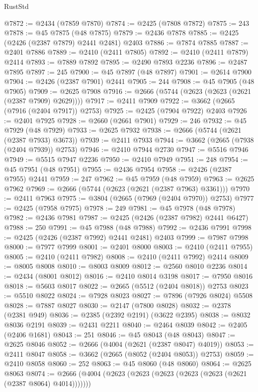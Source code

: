 \begin{lexlean}{RustStd}
\begin{coremodule}
@7872 := @2434 (@7859 @7870)
@7874 := @2425 (@7808 @7872)
@7875 := 243
@7878 := @45 @7875 (@48 @7875)
@7879 := @2436 @7878
@7885 := @2425 (@2426 (@2387 @7879) @2441 @2481) @2403
@7886 := @7874 @7885
@7887 := @2401 @7886
@7889 := @2410 (@2411 @7805)
@7892 := @2410 (@2411 @7879) @2414
@7893 := @7889 @7892
@7895 := @2490 @7893 @2236
@7896 := @2487 @7895
@7897 := 245
@7900 := @45 @7897 (@48 @7897)
@7901 := @2614 @7900
@7904 := @2426 (@2387 @7901) @2441
@7905 := 244
@7908 := @45 @7905 (@48 @7905)
@7909 := @2625 @7908
@7916 := @2666 (@5744 (@2623 (@2623 (@2621 (@2387 @7909) @2629))))
@7917 := @2411 @7909
@7922 := @3662 (@2665 (@7916 (@2404 @7917)) @2753)
@7925 := @2425 (@7904 @7922) @2403
@7926 := @2401 @7925
@7928 := @2660 (@2661 @7901)
@7929 := 246
@7932 := @45 @7929 (@48 @7929)
@7933 := @2625 @7932
@7938 := @2666 (@5744 (@2621 (@2387 @7933) @3673))
@7939 := @2411 @7933
@7944 := @3662 (@2665 (@7938 (@2404 @7939)) @2753)
@7946 := @2410 @7944 @2730
@7947 := @5516 @7946
@7949 := @5515 @7947 @2236
@7950 := @2410 @7949
@7951 := 248
@7954 := @45 @7951 (@48 @7951)
@7955 := @2436 @7954
@7958 := @2426 (@2387 @7955) @2441
@7959 := 247
@7962 := @45 @7959 (@48 @7959)
@7963 := @2625 @7962
@7969 := @2666 (@5744 (@2623 (@2621 (@2387 @7963) @3361)))
@7970 := @2411 @7963
@7975 := @3804 (@2665 (@7969 (@2404 @7970)) @2753)
@7977 := @2425 (@7958 @7975)
@7978 := 249
@7981 := @45 @7978 (@48 @7978)
@7982 := @2436 @7981
@7987 := @2425 (@2426 (@2387 @7982) @2441 @6427)
@7988 := 250
@7991 := @45 @7988 (@48 @7988)
@7992 := @2436 @7991
@7998 := @2425 (@2426 (@2387 @7992) @2441 @2481) @2403
@7999 := @7987 @7998
@8000 := @7977 @7999
@8001 := @2401 @8000
@8003 := @2410 (@2411 @7955)
@8005 := @2410 (@2411 @7982)
@8008 := @2410 (@2411 @7992) @2414
@8009 := @8005 @8008
@8010 := @8003 @8009
@8012 := @2560 @8010 @2236
@8014 := @2434 (@8001 @8012)
@8016 := @2410 @8014 @3198
@8017 := @7950 @8016
@8018 := @5603 @8017
@8022 := @2665 (@5512 (@2404 @8018)) @2753
@8023 := @5510 @8022
@8024 := @7928 @8023
@8027 := @7896 (@7926 @8024) @5508
@8028 := @7887 @8027
@8030 := @2147 (@7800 @8028)
@8032 := @2378 (@2381 @949)
@8036 := @2385 (@2392 @2191) (@3622 @2395)
@8038 := @8032 @8036 @2191
@8039 := @2431 @2211
@8040 := @2464 @8039
@8042 := @2405 (@2406 @1681)
@8043 := 251
@8046 := @45 @8043 (@48 @8043)
@8047 := @2625 @8046
@8052 := @2666 (@4004 (@2621 (@2387 @8047) @4019))
@8053 := @2411 @8047
@8058 := @3662 (@2665 (@8052 (@2404 @8053)) @2753)
@8059 := @2410 @8058
@8060 := 252
@8063 := @45 @8060 (@48 @8060)
@8064 := @2625 @8063
@8074 := @2666 (@4004 (@2623 (@2623 (@2623 (@2623 (@2623 (@2621 (@2387 @8064) @4014)))))))

\end{coremodule}
\end{lexlean}
